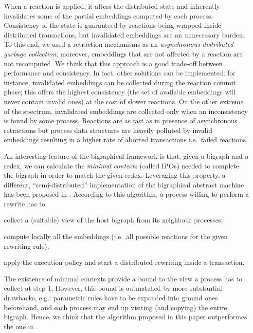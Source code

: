 \documentclass[a4paper,english,10pt]{article}
\theoremstyle{plain}\newtheorem{theorem}{Theorem}
\theoremstyle{plain}\newtheorem{corollary}[theorem]{Corollary}
\theoremstyle{plain}\newtheorem{proposition}[theorem]{Proposition}
\theoremstyle{plain}\newtheorem{lemma}[theorem]{Lemma}
\theoremstyle{plain}\newtheorem{definition}{Definition}
\theoremstyle{plain}\newtheorem{remark}{Remark}
\theoremstyle{plain}\newtheorem{example}[remark]{Example}
\newcommand{\?}[1]{}
\begin{document}
When a reaction is applied, it alters the distributed state and
inherently invalidates some of the partial embeddings computed by each
process.  Consistency of the state is guaranteed by reactions being
wrapped inside distributed transactions, but invalidated embeddings
are an unnecessary burden. To this end, we used a retraction
mechanisms as an \emph{asynchronous distributed garbage collection};
moreover, embeddings that are not affected by a reaction are not
recomputed.  We think that this approach is a good trade-off between
performance and consistency.  In fact, other solutions can be
implemented; for instance, invalidated embeddings can be collected
during the reaction commit phase; this offers the highest consistency
(the set of available embeddings will never contain invalid ones) at
the cost of slower reactions. On the other extreme of the spectrum,
invalidated embeddings are collected only when an inconsistency is
found by some process. Reactions are as fast as in presence of
asynchronous retractions but process data structures are heavily
polluted by invalid embeddings resulting in a higher rate of
aborted transactions i.e.~failed reactions.

An interesting feature of the bigraphical framework is that, given a
bigraph and a redex, we can calculate the \emph{minimal contexts}
(called IPOs)
needed to complete the bigraph in order to match the given redex.
Leveraging this property, a different, ``semi-distributed''
implementation of the bigraphical abstract machine has been proposed
in \cite{mmp:dais14}.  According to this algorithm, a process willing
to perform a rewrite has to
\begin{enumerate*}[label=\em(\arabic*)]
	\item
		collect a (suitable) view of the host
		bigraph from its neighbour processes; 
	\item 
		compute locally all the
		embeddings (i.e.~all possible reactions for 
		the given rewriting rule);
	\item
		apply the execution policy and start 
		a distributed rewriting inside a transaction.
\end{enumerate*} 
The existence of minimal contexts provide a bound to
the view a process has to collect at step 1. However, this bound is
outmatched by more substantial drawbacks, e.g.: parametric rules have
to be expanded into ground ones beforehand, and each process may end
up visiting (and copying) the entire bigraph.  Hence, we think that
the algorithm proposed in this paper outperformes the one in \cite{mmp:dais14}. 
\end{document}
